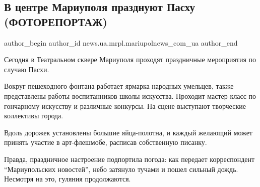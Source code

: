  
 
 
 
 
 
\subsection{В центре Мариуполя празднуют Пасху (ФОТОРЕПОРТАЖ)}
\label{sec:29_04_2019.stz.news.ua.mrpl.mariupolnews_com_ua.1.v_centre_prazdnujut_pashu_fotoreportazh}
 
\ifcmt
 author_begin
   author_id news.ua.mrpl.mariupolnews_com_ua
 author_end
\fi

Сегодня в Театральном сквере Мариуполя проходят праздничные мероприятия по
случаю Пасхи.

Вокруг пешеходного фонтана работает ярмарка народных умельцев, также
представлены работы воспитанников школы искусства. Проходит мастер-класс по
гончарному искусству и различные конкурсы. На сцене выступают творческие
коллективы города.


Вдоль дорожек установлены большие яйца-полотна, и каждый желающий может принять
участие в арт-флешмобе, расписав собственную писанку.

Правда, праздничное настроение подпортила погода: как передает корреспондент
\enquote{Мариупольских новостей}, небо затянуло тучами и пошел сильный дождь. Несмотря
на это, гуляния продолжаются.

